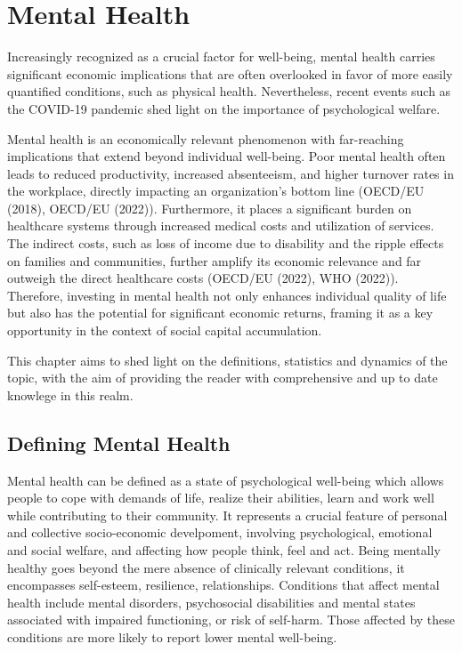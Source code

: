 \chapter{Mental Health}

Increasingly recognized as a crucial factor for well-being, mental health carries significant economic implications that are often overlooked in favor of more easily quantified conditions, such as physical health. Nevertheless, recent events such as the COVID-19 pandemic shed light on the importance of psychological welfare. 

Mental health is an economically relevant phenomenon with far-reaching implications that extend beyond individual well-being. Poor mental health often leads to reduced productivity, increased absenteeism, and higher turnover rates in the workplace, directly impacting an organization's bottom line (OECD/EU (2018), OECD/EU (2022)). Furthermore, it places a significant burden on healthcare systems through increased medical costs and utilization of services. The indirect costs, such as loss of income due to disability and the ripple effects on families and communities, further amplify its economic relevance and far outweigh the direct healthcare costs (OECD/EU (2022), WHO (2022)). Therefore, investing in mental health not only enhances individual quality of life but also has the potential for significant economic returns, framing it as a key opportunity in the context of social capital accumulation.

This chapter aims to shed light on the definitions, statistics and dynamics of the topic, with the aim of providing the reader with comprehensive and up to date knowlege in this realm. 

\section{Defining Mental Health}
    Mental health can be defined as a state of psychological well-being which allows people to cope with demands of life, realize their abilities, learn and work well while contributing to their community. It represents a crucial feature of personal and collective socio-economic develpoment, involving psychological, emotional and social welfare, and affecting how people think, feel and act. 
    Being mentally healthy goes beyond the mere absence of clinically relevant conditions, it encompasses self-esteem, resilience, relationships. Conditions that affect mental health include mental disorders, psychosocial disabilities and mental states associated with impaired functioning, or risk of self-harm. Those affected by these conditions are more likely to report lower mental well-being. 

